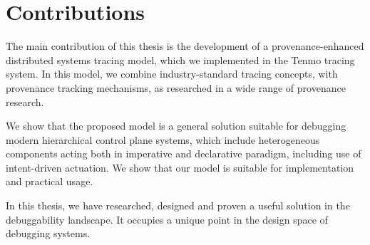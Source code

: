 \section{Contributions}

The main contribution of this thesis is the development of a provenance-enhanced distributed systems tracing model, which we implemented in the Tenmo tracing system. In this model, we combine industry-standard tracing concepts, with provenance tracking mechanisms, as researched in a wide range of provenance research.

We show that the proposed model is a general solution suitable for debugging modern hierarchical control plane systems, which include heterogeneous components acting both in imperative and declarative paradigm, including use of intent-driven actuation. We show that our model is suitable for implementation and practical usage.

In this thesis, we have researched, designed and proven a useful solution in the debuggability landscape. It occupies a unique point in the design space of debugging systems.

